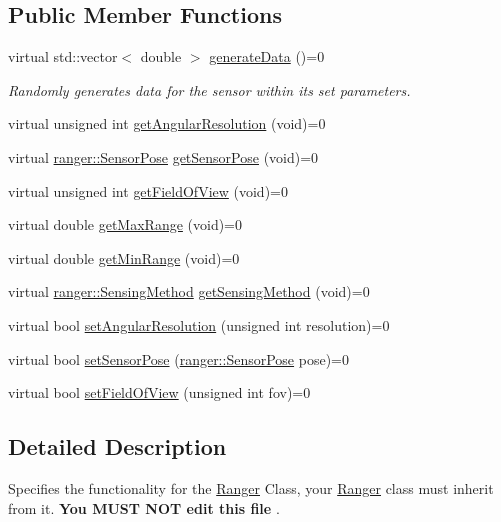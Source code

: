 \subsection*{Public Member Functions}
\begin{DoxyCompactItemize}
\item 
virtual std\+::vector$<$ double $>$ \hyperlink{classRangerInterface_a969c670cadf55a15733809116dc305c8}{generate\+Data} ()=0
\begin{DoxyCompactList}\small\item\em Randomly generates data for the sensor within its set parameters. \end{DoxyCompactList}\item 
virtual unsigned int \hyperlink{classRangerInterface_a37d4f89daffa8b2708dfc11034893552}{get\+Angular\+Resolution} (void)=0
\item 
virtual \hyperlink{structranger_1_1SensorPose}{ranger\+::\+Sensor\+Pose} \hyperlink{classRangerInterface_a7f6db3f603d997ad6c5aa5c7778261f4}{get\+Sensor\+Pose} (void)=0
\item 
virtual unsigned int \hyperlink{classRangerInterface_a18716da6932402b8dda75f682be6f06c}{get\+Field\+Of\+View} (void)=0
\item 
virtual double \hyperlink{classRangerInterface_a0bb29a41de5767c99081002c0590c186}{get\+Max\+Range} (void)=0
\item 
virtual double \hyperlink{classRangerInterface_ae6d501ddeeaad4a7b44d7d51ce64cb88}{get\+Min\+Range} (void)=0
\item 
virtual \hyperlink{namespaceranger_ab04465c229cc50595ffe40a891a3b135}{ranger\+::\+Sensing\+Method} \hyperlink{classRangerInterface_aeb06b9835f2b162b81917bd27797549b}{get\+Sensing\+Method} (void)=0
\item 
virtual bool \hyperlink{classRangerInterface_aecffc9bbb58379da741c18326b9e41db}{set\+Angular\+Resolution} (unsigned int resolution)=0
\item 
virtual bool \hyperlink{classRangerInterface_a452301937b5ace7ded943d8aa76a061f}{set\+Sensor\+Pose} (\hyperlink{structranger_1_1SensorPose}{ranger\+::\+Sensor\+Pose} pose)=0
\item 
virtual bool \hyperlink{classRangerInterface_a70357ca516198af45e2d503ef6af8f9f}{set\+Field\+Of\+View} (unsigned int fov)=0
\end{DoxyCompactItemize}


\subsection{Detailed Description}
Specifies the functionality for the \hyperlink{classRanger}{Ranger} Class, your \hyperlink{classRanger}{Ranger} class must inherit from it. {\bfseries  You M\+U\+ST N\+OT edit this file }. 

